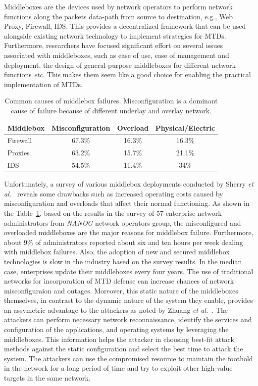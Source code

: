 Middleboxes are the devices used by network operators to perform network functions along the packets data-path from source to destination, e.g., Web Proxy, Firewall, IDS. This provides a decentralized framework that can be used alongside existing network technology to implement strategies for MTDs. Furthermore, researchers have focused significant effort on several issues associated with middleboxes, such as ease of use, ease of management and deployment, the design of general-purpose middleboxes for different network functions {\em etc.} This makes them seem like a good choice for enabling the practical implementation of MTDs.
\begin{table}[t!]
\centering
\begin{tabular}{|l|c|c|c|}
\hline
\textbf{Middlebox} & \textbf{Misconfiguration} & \textbf{Overload} & \textbf{Physical/Electric}  \\
\hline
Firewall & 67.3\% & 16.3\% & 16.3\% \\
\hline
Proxies & 63.2\% & 15.7\% & 21.1\% \\
\hline
IDS & 54.5\% & 11.4\% & 34\% \\
\hline
\end{tabular}
\caption{Common causes of middlebox failures. Misconfiguration is a dominant cause of failure because of different underlay and overlay network.}
 \label{tab:1}
  \vspace{-1.2em}
\end{table}
Unfortunately, a survey of various middlebox deployments conducted by Sherry \textit{et al.}~ reveals some drawbacks such as increased operating costs caused by misconfiguration and overloads that affect their normal functioning. As shown in the Table~\ref{tab:1}, based on the results in the survey  of 57 enterprise network administrators from \emph{NANOG} network operators group, the misconfigured and overloaded middleboxes are the major reasons for middlebox failure. Furthermore, about 9\% of administrators reported about six and ten hours per week dealing with middlebox failures. Also, the adoption of new and secured middlebox technologies is slow in the industry based on the survey results. In the median case, enterprises update their middleboxes every four years. The use of traditional networks for incorporation of MTD defense can increase chances of network misconfiguraion and outages.
Moreover, this static nature of the middleboxes themselves, in contrast to the dynamic nature of the system they enable, provides an assymetric advantage to the attackers as noted by Zhuang \textit{et al.}~. The attackers can perform necessary network reconnaissance, identify the services and configuration of the applications, and operating systems by leveraging the middleboxes. This information helps the attacker in choosing best-fit attack methods against the static configuration and select the best time to attack the system. The attackers can use the compromised resource to maintain the foothold in the network for a long period of time and try to exploit other high-value targets in the same network.


